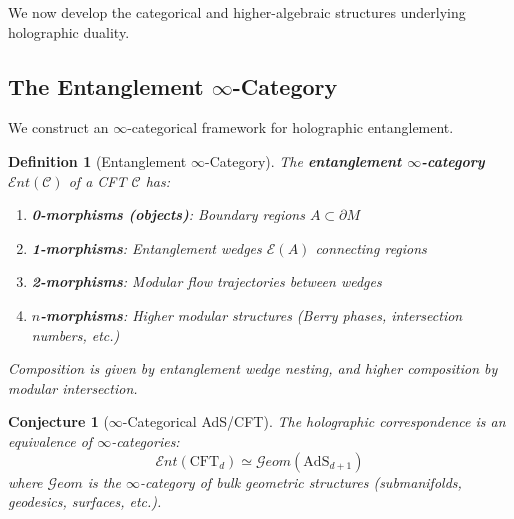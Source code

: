 \documentclass[12pt,a4paper]{article}
\newtheorem{conjecture}[theorem]{Conjecture}
\newtheorem{definition}[theorem]{Definition}
\begin{document}
We now develop the categorical and higher-algebraic structures underlying holographic duality.

\subsection{The Entanglement $\infty$-Category}

We construct an $\infty$-categorical framework for holographic entanglement.

\begin{definition}[Entanglement $\infty$-Category]
The \textbf{entanglement $\infty$-category} $\mathcal{E}nt(\mathcal{C})$ of a CFT $\mathcal{C}$ has:
\begin{enumerate}
    \item \textbf{0-morphisms (objects)}: Boundary regions $A \subset \partial M$
    \item \textbf{1-morphisms}: Entanglement wedges $\mathcal{E}(A)$ connecting regions
    \item \textbf{2-morphisms}: Modular flow trajectories between wedges
    \item \textbf{$n$-morphisms}: Higher modular structures (Berry phases, intersection numbers, etc.)
\end{enumerate}
Composition is given by entanglement wedge nesting, and higher composition by modular intersection.
\end{definition}

\begin{conjecture}[$\infty$-Categorical AdS/CFT]
The holographic correspondence is an equivalence of $\infty$-categories:
\begin{equation}
\mathcal{E}nt(\text{CFT}_d) \simeq \mathcal{G}eom(\text{AdS}_{d+1})
\end{equation}
where $\mathcal{G}eom$ is the $\infty$-category of bulk geometric structures (submanifolds, geodesics, surfaces, etc.).
\end{conjecture}
\end{document}
